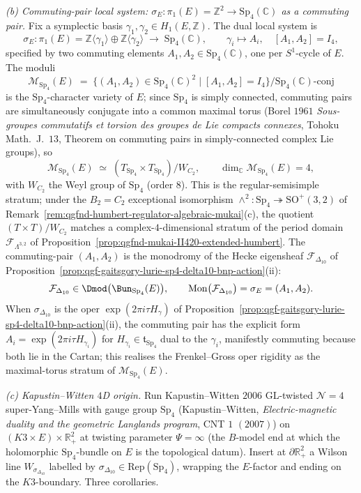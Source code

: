 \begin{proposition}
\emph{(b) Commuting-pair local system:
$\sigma_E\colon\pi_1(E)=\mathbb Z^2\to\mathrm{Sp}_4(\mathbb C)$
as a commuting pair.} Fix a symplectic basis
$\gamma_1,\gamma_2\in H_1(E,\mathbb Z)$. The dual local system is
\[
 \sigma_E\colon\pi_1(E)=\mathbb Z\langle\gamma_1\rangle\oplus\mathbb Z\langle\gamma_2\rangle
 \;\longrightarrow\;\mathrm{Sp}_4(\mathbb C),
 \qquad\gamma_i\mapsto A_i,\quad[A_1,A_2]=I_4,
\]
specified by two commuting elements $A_1,A_2\in\mathrm{Sp}_4(\mathbb C)$,
one per $S^1$-cycle of $E$. The moduli
\[
 \mathcal M_{\mathrm{Sp}_4}(E)
 \;=\;\bigl\{(A_1,A_2)\in\mathrm{Sp}_4(\mathbb C)^2\;\big|\;[A_1,A_2]=I_4\bigr\}
 \big/\mathrm{Sp}_4(\mathbb C)\text{-conj}
\]
is the $\mathrm{Sp}_4$-character variety of $E$; since $\mathrm{Sp}_4$
is simply connected, commuting pairs are simultaneously conjugate into
a common maximal torus (Borel $1961$ \emph{Sous-groupes commutatifs et
torsion des groupes de Lie compacts connexes}, Tohoku Math.\ J.\ $13$,
Theorem on commuting pairs in simply-connected complex Lie groups),
so
\[
 \mathcal M_{\mathrm{Sp}_4}(E)\;\simeq\;(T_{\mathrm{Sp}_4}\times T_{\mathrm{Sp}_4})/W_{C_2},
 \qquad\dim_{\mathbb C}\mathcal M_{\mathrm{Sp}_4}(E)=4,
\]
with $W_{C_2}$ the Weyl group of $\mathrm{Sp}_4$ (order $8$). This is
the regular-semisimple stratum; under the $B_2=C_2$ exceptional
isomorphism $\wedge^2\colon\mathrm{Sp}_4\twoheadrightarrow\mathrm{SO}^+(3,2)$
of Remark~\ref{rem:qgfnd-humbert-regulator-algebraic-mukai}(c), the
quotient $(T\times T)/W_{C_2}$ matches a complex-$4$-dimensional stratum
of the period domain $\mathcal F_{\Lambda^{3,2}}$ of
Proposition~\ref{prop:qgfnd-mukai-II420-extended-humbert}. The
commuting-pair $(A_1,A_2)$ is the monodromy of the Hecke eigensheaf
$\mathcal F_{\Delta_{10}}$ of
Proposition~\ref{prop:qgf-gaitsgory-lurie-sp4-delta10-bnp-action}(ii):
\[
 \mathcal F_{\Delta_{10}}\in\Dmod\bigl(\Bun_{\mathrm{Sp}_4}(E)\bigr),
 \qquad\mathrm{Mon}\bigl(\mathcal F_{\Delta_{10}}\bigr)=\sigma_E=(A_1,A_2).
\]
When $\sigma_{\Delta_{10}}$ is the oper
$\exp\!\left(2\pi i\tau H_\gamma\right)$ of
Proposition~\ref{prop:qgf-gaitsgory-lurie-sp4-delta10-bnp-action}(ii),
the commuting pair has the explicit form
$A_i=\exp\!\left(2\pi i\tau H_{\gamma_i}\right)$ for
$H_{\gamma_i}\in\mathfrak t_{\mathrm{Sp}_4}$ dual to the $\gamma_i$,
manifestly commuting because both lie in the Cartan; this realises
the Frenkel--Gross oper rigidity as the maximal-torus stratum of
$\mathcal M_{\mathrm{Sp}_4}(E)$.

\emph{(c) Kapustin--Witten $4$D origin.} Run Kapustin--Witten $2006$
GL-twisted $\mathcal N=4$ super-Yang--Mills with gauge group
$\mathrm{Sp}_4$ (Kapustin--Witten, \emph{Electric-magnetic duality
and the geometric Langlands program}, CNT $1$ $(2007)$) on
$(K3\times E)\times\mathbb R_+^2$ at twisting parameter
$\Psi=\infty$ (the $B$-model end at which the holomorphic
$\mathrm{Sp}_4$-bundle on $E$ is the topological datum). Insert at
$\partial\mathbb R_+^2$ a Wilson line
$W_{\sigma_{\Delta_{10}}}$ labelled by
$\sigma_{\Delta_{10}}\in\mathrm{Rep}(\mathrm{Sp}_4)$, wrapping the
$E$-factor and ending on the $K3$-boundary. Three corollaries.


\end{proposition}

